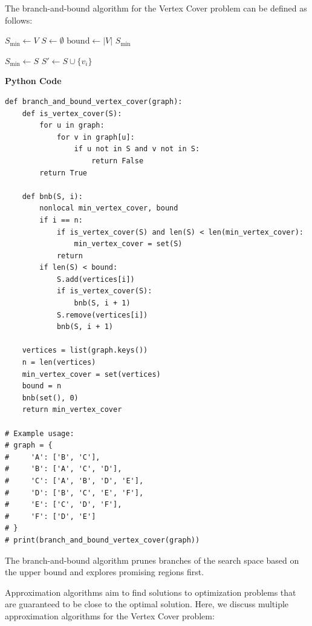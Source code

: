 \documentclass[12pt]{book} %
\begin{document}
The branch-and-bound algorithm for the Vertex Cover problem can be defined as follows:
\FloatBarrier
\begin{algorithm}
\caption{Branch-and-Bound Vertex Cover}
\begin{algorithmic}[1]
\State $S_{\text{min}} \gets V$
\State $S \gets \emptyset$
\State $\text{bound} \gets |V|$
\State {}
\State \Return $S_{\text{min}}$
\EndFunction

        \State $S_{\text{min}} \gets S$
    \EndIf
{}
    \State $S' \gets S \cup \{v_i\}$
        \State {}
    \EndIf
    \State {}
\EndIf
\EndFunction
\end{algorithmic}
\end{algorithm}
\FloatBarrier
\textbf{Python Code}
\FloatBarrier
\begin{lstlisting}
def branch_and_bound_vertex_cover(graph):
    def is_vertex_cover(S):
        for u in graph:
            for v in graph[u]:
                if u not in S and v not in S:
                    return False
        return True
    
    def bnb(S, i):
        nonlocal min_vertex_cover, bound
        if i == n:
            if is_vertex_cover(S) and len(S) < len(min_vertex_cover):
                min_vertex_cover = set(S)
            return
        if len(S) < bound:
            S.add(vertices[i])
            if is_vertex_cover(S):
                bnb(S, i + 1)
            S.remove(vertices[i])
            bnb(S, i + 1)
    
    vertices = list(graph.keys())
    n = len(vertices)
    min_vertex_cover = set(vertices)
    bound = n
    bnb(set(), 0)
    return min_vertex_cover

# Example usage:
# graph = {
#     'A': ['B', 'C'],
#     'B': ['A', 'C', 'D'],
#     'C': ['A', 'B', 'D', 'E'],
#     'D': ['B', 'C', 'E', 'F'],
#     'E': ['C', 'D', 'F'],
#     'F': ['D', 'E']
# }
# print(branch_and_bound_vertex_cover(graph))
\end{lstlisting}
\FloatBarrier
The branch-and-bound algorithm prunes branches of the search space based on the upper bound and explores promising regions first.

Approximation algorithms aim to find solutions to optimization problems that are guaranteed to be close to the optimal solution. Here, we discuss multiple approximation algorithms for the Vertex Cover problem:
\end{document}
